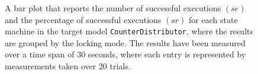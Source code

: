 \begin{figure}[h!]
\centering
\begin{minipage}{1\textwidth}
  \centering
  \makebox[\textwidth][c]{ %
        \resizebox{1.19\textwidth}{!}{ %
            
        }%
    }%
\end{minipage}
\caption{A bar plot that reports the number of successful executions $(se)$ and the percentage of successful executions $(sr)$ for each state machine in the target model \texttt{CounterDistributor}, where the results are grouped by the locking mode. The results have been measured over a time span of 30 seconds, where each entry is represented by measurements taken over 20 trials.}
\label{figure:locking_mode_state_machine_transition_frequency_comparison_counterdistributor}
\end{figure}